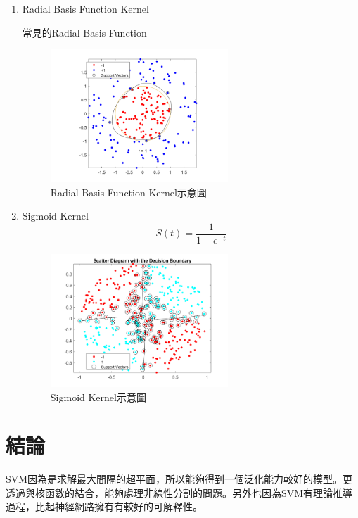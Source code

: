 \begin{enumerate}
	\item
	      Radial Basis Function Kernel
	      \begin{table}[h!]
		      \centering
		      \label{tab:rbf_table}
		      
		      \caption{常見的Radial Basis Function}
	      \end{table}
	      \begin{figure}[H]
		      \centerline{\includegraphics[height=5cm]{pic/Radial Basis Function Kernel.png}}
		      \caption{Radial Basis Function Kernel示意圖}
		      \label{fig:Radial Basis}
	      \end{figure}
	\item
	      Sigmoid Kernel
	      \begin{equation}
		      \label{eqn:Sigmoid Kerne}
		      S(t)=\frac{1}{1+e^{-t}}
	      \end{equation}
	      \begin{figure}[H]
		      \centerline{\includegraphics[height=5cm]{pic/Sigmoid Kernel.png}}
		      \caption{Sigmoid Kernel示意圖}
		      \label{Sigmoid Kernel}
	      \end{figure}
\end{enumerate}


\section{結論}
SVM因為是求解最大間隔的超平面，所以能夠得到一個泛化能力較好的模型。更透過與核函數的結合，能夠處理非線性分割的問題。另外也因為SVM有理論推導過程，比起神經網路擁有有較好的可解釋性。

